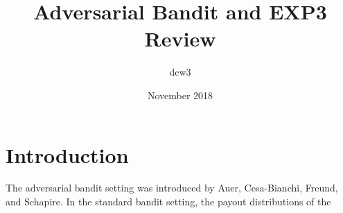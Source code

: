 \documentclass{article}
\title{Adversarial Bandit and EXP3 Review}
\author{dcw3}
\date{November 2018}
\begin{document}
\maketitle

\section{Introduction}

The adversarial bandit setting was introduced by Auer, Cesa-Bianchi, Freund, and Schapire. In the standard bandit setting, the payout distributions of the 
\end{document}
